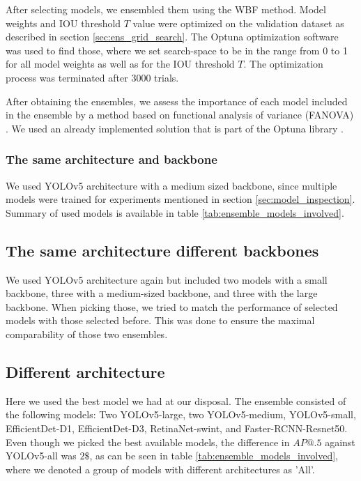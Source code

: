 After selecting models, we ensembled them using the WBF method. Model weights and IOU threshold $T$ value were optimized on the validation dataset as described in section \ref{sec:ens_grid_search}. The Optuna optimization software was used to find those, where we set search-space to be in the range from 0 to 1 for all model weights as well as for the IOU threshold $T$. The optimization process was terminated after $3000$ trials.

After obtaining the ensembles, we assess the importance of each model included in the ensemble by a method based on functional analysis of variance (FANOVA) \cite{Hutter2014}. We used an already implemented solution that is part of the Optuna library \cite{Akiba2019}.
\subsubsection{The same architecture and backbone}
We used YOLOv5 architecture with a medium sized backbone, since multiple models were trained for experiments mentioned in section \ref{sec:model_inspection}. Summary of used models is available in table \ref{tab:ensemble_models_involved}.

\subsection{The same architecture different backbones}
We used YOLOv5 architecture again but included two models with a small backbone, three with a medium-sized backbone, and three with the large backbone. When picking those, we tried to match the performance of selected models with those selected before. This was done to ensure the maximal comparability of those two ensembles.

\subsection{Different architecture}
Here we used the best model we had at our disposal. The ensemble consisted of the following models: Two YOLOv5-large, two YOLOv5-medium, YOLOv5-small, EfficientDet-D1, EfficientDet-D3, RetinaNet-swint, and Faster-RCNN-Resnet50. Even though we picked the best available models, the difference in $AP@.5$ against YOLOv5-all was $2\$$, as can be seen in table \ref{tab:ensemble_models_involved}, where we denoted a group of models with different architectures as 'All'.

